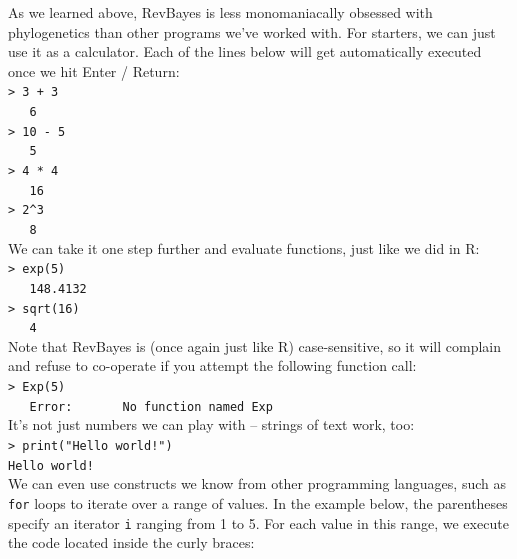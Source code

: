 \documentclass[12pt]{article}
\begin{document}
\noindent As we learned above, RevBayes is less monomaniacally obsessed with phylogenetics than other programs we've worked with. For starters, we can just use it as a calculator. Each of the lines below will get automatically executed once we hit Enter / Return: \\

\indent \texttt{> 3 + 3} \\
\indent \texttt{\ \ \ 6} \\
\indent \texttt{> 10 - 5} \\
\indent \texttt{\ \ \ 5} \\
\indent \texttt{> 4 * 4} \\
\indent \texttt{\ \ \ 16} \\
\indent \texttt{> 2\^{}3} \\
\indent \texttt{\ \ \ 8} \\

\noindent We can take it one step further and evaluate functions, just like we did in \textsf{R}: \\

\indent \texttt{> exp(5)} \\
\indent \texttt{\ \ \ 148.4132} \\
\indent \texttt{> sqrt(16)} \\
\indent \texttt{\ \ \ 4} \\

\noindent Note that RevBayes is (once again just like \textsf{R}) case-sensitive, so it will complain and refuse to co-operate if you attempt the following function call: \\

\indent \texttt{> Exp(5)} \\
\indent \texttt{\ \ \ Error: \ \ \ \ \ \ No function named \textquotesingle Exp\textquotesingle} \\

\noindent It's not just numbers we can play with -- strings of text work, too: \\

\indent \texttt{> print("Hello world!")} \\
\indent \texttt{Hello world!} \\

\noindent We can even use constructs we know from other programming languages, such as \texttt{for} loops to iterate over a range of values. In the example below, the parentheses specify an iterator \texttt{i} ranging from 1 to 5. For each value in this range, we execute the code located inside the curly braces: \\
\end{document}
